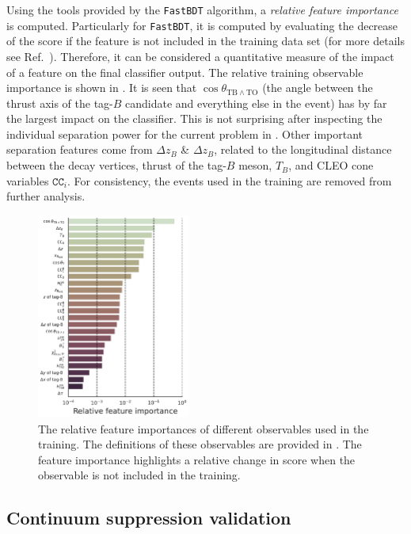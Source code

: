 Using the tools provided by the \texttt{FastBDT} algorithm, a \textit{relative feature importance} is computed.
Particularly for \texttt{FastBDT}, it is computed by evaluating the decrease of the \AUC score if the feature is not included in the training data set (for more details see Ref.~\cite{Keck:2017gsv}).
Therefore, it can be considered a quantitative measure of the impact of a feature on the final classifier output.
The relative training observable importance is shown in . 
It is seen that $\cos\theta_{\mathrm{TB}\wedge\mathrm{TO}}$ (the angle between the thrust axis of the tag-$B$ candidate and everything else in the event) has by far the largest impact on the classifier.
This is not surprising after inspecting the individual separation power for the current problem in .
Other important separation features come from  $\Delta z_B$ \&  $\Delta z_B$, related to the longitudinal distance between the decay vertices,
thrust of the tag-$B$ meson, $T_B$, and CLEO cone variables $\mathtt{CC}_i$. 
For consistency, the events used in the training are removed from further analysis.

\begin{figure}[htbp!]
    \centering
    \includegraphics[width=0.45\textwidth]{figures/continuum_suppression/feature_importance.pdf}
    \caption{\label{fig:feature_importance} The relative feature importances of different observables used in the training.
    The definitions of these observables are provided in .
    The feature importance highlights a relative change in \AUC score when the observable is not included in the training.
    }
\end{figure}

\subsection{Continuum suppression validation}\label{sec:continuum_validation}

